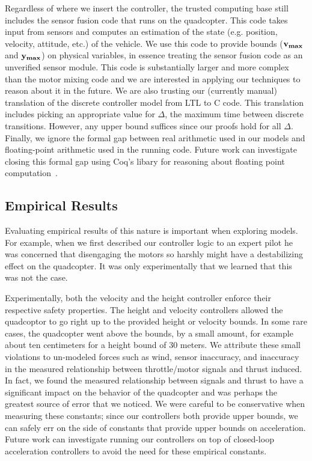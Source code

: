 Regardless of where we insert the controller, the trusted computing base
still includes the sensor fusion code that runs on the quadcopter. This
code takes input from sensors and computes an estimation of the state
(e.g. position, velocity, attitude, etc.) of the vehicle. We use this code
to provide bounds ($\mathbf{v_{max}}$ and $\mathbf{\mathbf{y}_{max}}$) on physical variables, in essence
treating the sensor fusion code as an unverified sensor module.  This code
is substantially larger and more complex than the motor mixing code and we
are interested in applying our techniques to reason about it in the future.
We are also trusting our (currently manual) translation of the discrete
controller model from LTL to C code.  This translation includes picking an
appropriate value for $\Delta$, the maximum time between discrete
transitions.  However, any upper bound suffices since our proofs hold for
all $\Delta$.  Finally, we ignore the formal gap between real arithmetic
used in our models and floating-point arithmetic used in the running code.
Future work can investigate closing this formal gap using Coq's libary for
reasoning about floating point computation~\cite{flocq11}.

\subsection{Empirical Results}
\label{sec:results}
Evaluating empirical results of this nature is important when exploring
models.  For example, when we first described our controller logic to an expert
pilot he was concerned that disengaging the motors so harshly might have a
destabilizing effect on the quadcopter.  It was only experimentally that we
learned that this was not the case.

Experimentally, both the velocity and the height controller enforce their
respective safety properties.  The height and velocity controllers allowed
the quadcoptor to go right up to the provided height or velocity bounds.
In some rare cases, the quadcopter went above the bounds, by a small
amount, for example about ten centimeters for a height bound of 30 meters.
We attribute these small violations to un-modeled forces such as wind,
sensor inaccuracy, and inaccuracy in the measured relationship between
throttle/motor signals and thrust induced.  In fact, we found the measured
relationship between signals and thrust to have a significant impact on the
behavior of the quadcopter and was perhaps the greatest source of error
that we noticed.  We were careful to be conservative when measuring these
constants; since our controllers both provide upper bounds, we can safely
err on the side of constants that provide upper bounds on acceleration.
Future work can investigate running our controllers on top of closed-loop
acceleration controllers to avoid the need for these empirical constants.

